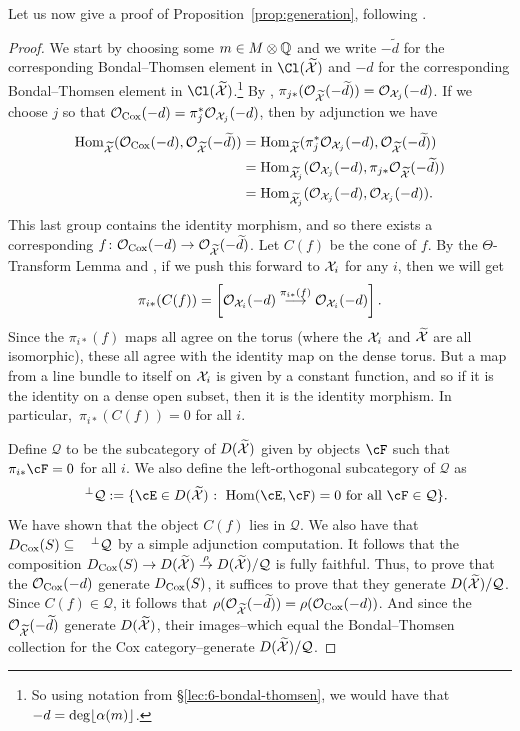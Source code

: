 \documentclass{amsart}
\begin{document}
Let us now give a proof of Proposition~\ref{prop:generation}, following \cite[Proposition 5.1]{BBB+24}. 

\begin{proof}We start by choosing some $m\in M\otimes \mathbb Q$ and we write $-\widetilde{d}$ for the corresponding Bondal--Thomsen element in $ \Cl(\widetilde{\sX})$  and $-d$ for the corresponding Bondal--Thomsen element in $ \Cl(\widetilde{\sX})$.\footnote{So using notation from \S\ref{lec:6-bondal-thomsen}, we would have that $-d = \deg \lfloor\alpha(m)\rfloor$.}  By \cite[Proposition 2.28]{BBB+24}, $\pi_{j*}({\mathcal O}_{\widetilde{\mathcal X}}(-\widetilde{d})) = {\mathcal O}_{\mathcal X_j}(-d)$.  If we choose $j$ so that ${\mathcal O}_{\operatorname{Cox}}(-d)=\pi_j^* {\mathcal O}_{\mathcal X_j}(-d)$, then by adjunction we have
\begin{align*}
\operatorname{Hom}_{\widetilde{\mathcal X}}({\mathcal O}_{\operatorname{Cox}}(-d), {\mathcal O}_{\widetilde{\mathcal X}}(-\widetilde{d}))
&=
\operatorname{Hom}_{\widetilde{\mathcal X}}(\pi_j^* {\mathcal O}_{\mathcal X_j}(-d), {\mathcal O}_{\widetilde{\mathcal X}}(-\widetilde{d}))\\
&=
\operatorname{Hom}_{\widetilde{\mathcal X_j}}({\mathcal O}_{\mathcal X_j}(-d), \pi_{j*} {\mathcal O}_{\widetilde{\mathcal X}}(-\widetilde{d}))\\
&=
\operatorname{Hom}_{\widetilde{\mathcal X_j}}({\mathcal O}_{\mathcal X_j}(-d), {\mathcal O}_{\mathcal X_j}(-d)).
\end{align*}
This last group contains the identity morphism, and so there exists a corresponding $f\colon {\mathcal O}_{\operatorname{Cox}}(-d)\to {\mathcal O}_{\widetilde{\mathcal X}}(-\widetilde{d})$.  Let $C(f)$ be the cone of $f$.  By the $\Theta$-Transform Lemma and \cite[Proposition 2.28]{BBB+24}, if we push this forward to $\mathcal X_i$ for any $i$, then we will get
\[
\pi_{i*}(C(f)) = \left[ {\mathcal O}_{\mathcal X_i}(-d) \overset{\pi_{i*}(f)}{\longrightarrow
}{\mathcal O}_{\mathcal X_i}(-d)\right].
\]
Since the $\pi_{i*}(f)$ maps all agree on the torus (where the $\mathcal X_i$ and $\widetilde{\mathcal X}$ are all isomorphic), these all agree with the identity map on the dense torus.  But a map from a line bundle to itself on $\mathcal X_i$ is given by a constant function, and so if it is the identity on a dense open subset, then it is the identity morphism.  In particular,~$\pi_{i*}(C(f))=0$ for all $i$.

Define $\mathcal Q$ to be the subcategory of $D(\widetilde{\mathcal X})$ given by objects $\cF$ such that $\pi_{i*}\cF = 0$ for all $i$. We also define the left-orthogonal subcategory of $\mathcal Q$ as
\[
\phantom{X}^{\perp}\mathcal Q := \{ \cE \in D(\widetilde{\sX}) \text{ : } \Hom(\cE, \cF) = 0 \text{ for all }\cF \in \mathcal Q\}.
\]
We have shown that the object $C(f)$ lies in $\mathcal Q$.  We also have that $D_{\operatorname{Cox}}(S) \subseteq \phantom{X}^{\perp}\mathcal Q$ by a simple adjunction computation.  It follows that the composition $D_{\operatorname{Cox}}(S) \to D(\widetilde{\mathcal X}) \overset{\rho}{\to} D(\widetilde{\mathcal X})/ \mathcal Q$ is fully faithful.  Thus, to prove that the ${\mathcal O}_{\operatorname{Cox}}(-d)$ generate $D_{\operatorname{Cox}}(S)$, it suffices to prove that they generate $D(\widetilde{\mathcal X})/ \mathcal Q$.  Since $C(f) \in \mathcal Q$, it follows that $\rho({\mathcal O}_{\widetilde{\mathcal X}}(-\widetilde{d})) = \rho({\mathcal O}_{\operatorname{Cox}}(-d))$.  And since the ${\mathcal O}_{\widetilde{\mathcal X}}(-\widetilde{d})$ generate $D(\widetilde{\mathcal X})$, their images--which equal the Bondal--Thomsen collection for the Cox category--generate $D(\widetilde{\mathcal X})/ \mathcal Q$.
\end{proof}


\ifdefined\whole
\else


\end{document}
